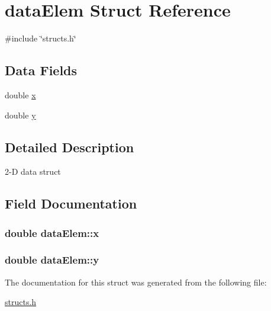 \hypertarget{structdataElem}{\section{data\-Elem Struct Reference}
\label{structdataElem}
}


{\ttfamily \#include \char`\"{}structs.\-h\char`\"{}}

\subsection*{Data Fields}
\begin{DoxyCompactItemize}
\item 
double \hyperlink{structdataElem_a1197e353644cfe60181b3257d761a2a3}{x}
\item 
double \hyperlink{structdataElem_a94f94bdba1be4815d4254d4c498baf49}{y}
\end{DoxyCompactItemize}


\subsection{Detailed Description}
2-\/\-D data struct 

\subsection{Field Documentation}
\hypertarget{structdataElem_a1197e353644cfe60181b3257d761a2a3}{
\subsubsection[{x}]{\setlength{\rightskip}{0pt plus 5cm}double data\-Elem\-::x}}\label{structdataElem_a1197e353644cfe60181b3257d761a2a3}
\hypertarget{structdataElem_a94f94bdba1be4815d4254d4c498baf49}{
\subsubsection[{y}]{\setlength{\rightskip}{0pt plus 5cm}double data\-Elem\-::y}}\label{structdataElem_a94f94bdba1be4815d4254d4c498baf49}


The documentation for this struct was generated from the following file\-:\begin{DoxyCompactItemize}
\item 
\hyperlink{structs_8h}{structs.\-h}\end{DoxyCompactItemize}
